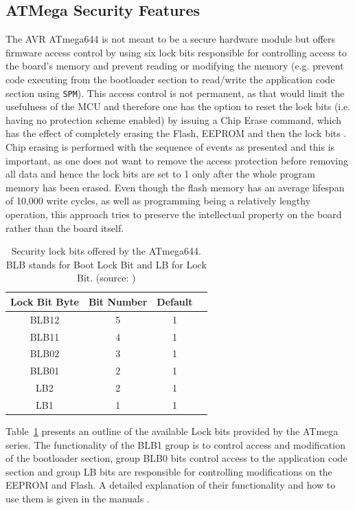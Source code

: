 	\subsection{ATMega Security Features}
	
	The AVR ATmega644 is not meant to be a secure hardware module but offers firmware access control by using six lock bits responsible for controlling access to the board's memory and prevent reading or modifying the memory (e.g. prevent code executing from the bootloader section to read/write the application code section using \texttt{SPM}). This access control is not permanent, as that would limit the usefulness of the MCU and therefore one has the option to reset the lock bits (i.e. having no protection scheme enabled) by issuing a Chip Erase command, which has the effect of completely erasing the Flash, EEPROM and then the lock bits \citep{atmega_manual}. Chip erasing is performed with the sequence of events as presented and this is important, as one does not want to remove the access protection before removing all data and hence the lock bits are set to 1 only after the whole program memory has been erased. Even though the flash memory has an average lifespan of 10,000 write cycles, as well as programming being a relatively lengthy operation, this approach tries to preserve the intellectual property on the board rather than the board itself.
	
	\begin{table}
		\caption{\footnotesize Security lock bits offered by the ATmega644. BLB stands for Boot Lock Bit and LB for Lock Bit. (source: \protect\citep{tech:avrfreaks} \citep{atmega_manual})}
		\label{table:lock_bits}
		\center
		\begin{tabular}{| c | c | c | c |}
			\hline
			\textbf{Lock Bit Byte} & \textbf{Bit Number} & \textbf{Default}\\
			\hline \hline
			BLB12 & 5 & 1\\
			BLB11 & 4 & 1\\
			BLB02 & 3 & 1\\
			BLB01 & 2 & 1\\
			LB2 & 2 & 1 \\
			LB1 & 1 & 1 \\
			\hline
		\end{tabular}
		
	\end{table}
	
Table~\ref{table:lock_bits} presents an outline of the available Lock bits provided by the ATmega series. The functionality of the BLB1 group is to control access and modification of the bootloader section, group BLB0 bits control access to the application code section and group LB bits are responsible for controlling modifications on the EEPROM and Flash. A detailed explanation of their functionality and how to use them is given in the manuals \citep{atmega_manual} \citep{tech:avrfreaks}.
	